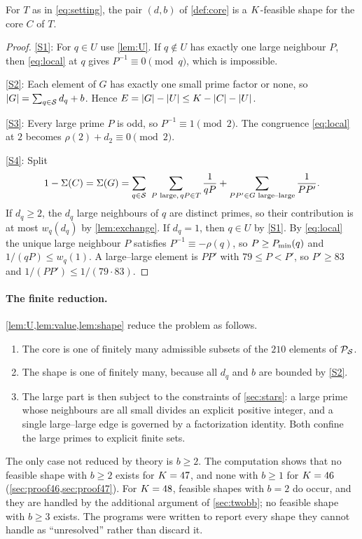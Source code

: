 \documentclass[11pt]{article}
\begin{document}
\begin{lemma}\label{lem:shape}
For $T$ as in \eqref{eq:setting}, the pair $(d,b)$ of \cref{def:core} is a $K$-feasible shape for the core $C$ of $T$.
\end{lemma}

\begin{proof}
\ref{S1}: For $q\in U$ use \cref{lem:U}. If $q\notin U$ has exactly one large neighbour $P$, then \eqref{eq:local} at $q$ gives $P^{-1}\equiv0\pmod q$, which is impossible.

\ref{S2}: Each element of $G$ has exactly one small prime factor or none, so $\lvert G\rvert=\sum_{q\in\mathcal{S}}d_q+b$. Hence $E=\lvert G\rvert-\lvert U\rvert\le K-\lvert C\rvert-\lvert U\rvert$.

\ref{S3}: Every large prime $P$ is odd, so $P^{-1}\equiv1\pmod2$. The congruence \eqref{eq:local} at $2$ becomes $\rho(2)+d_2\equiv0\pmod 2$.

\ref{S4}: Split
\[
1-\Rec{C}=\Rec{G}=\sum_{q\in\Sset}\ \sum_{P\text{ large},\,qP\in T}\frac1{qP}+\sum_{PP'\in G\text{ large--large}}\frac1{PP'} .
\]
If $d_q\ge2$, the $d_q$ large neighbours of $q$ are distinct primes, so their contribution is at most $w_q(d_q)$ by \cref{lem:exchange}.
If $d_q=1$, then $q\in U$ by \ref{S1}. By \eqref{eq:local} the unique large neighbour $P$ satisfies $P^{-1}\equiv-\rho(q)$, so $P\ge P_{\min}(q)$ and $1/(qP)\le w_q(1)$.
A large--large element is $PP'$ with $79\le P<P'$, so $P'\ge83$ and $1/(PP')\le1/(79\cdot83)$.
\end{proof}

\paragraph{The finite reduction.}
\cref{lem:U,lem:value,lem:shape} reduce the problem as follows.
\begin{enumerate}[label=(\arabic*)]
\item The core is one of finitely many admissible subsets of the $210$ elements of $\mathcal{P}_{\mathcal{S}}$.
\item The shape is one of finitely many, because all $d_q$ and $b$ are bounded by \ref{S2}.
\item The large part is then subject to the constraints of \cref{sec:stars}: a large prime whose neighbours are all small divides an explicit positive integer, and a single large--large edge is governed by a factorization identity. Both confine the large primes to explicit finite sets.
\end{enumerate}
The only case not reduced by theory is $b\ge2$. The computation shows that no feasible shape with $b\ge2$ exists for $K=47$, and none with $b\ge1$ for $K=46$ (\cref{sec:proof46,sec:proof47}). For $K=48$, feasible shapes with $b=2$ do occur, and they are handled by the additional argument of \cref{sec:twobb}; no feasible shape with $b\ge3$ exists. The programs were written to report every shape they cannot handle as ``unresolved'' rather than discard it.
\end{document}
